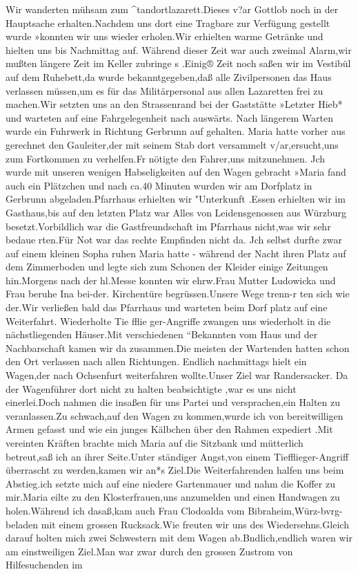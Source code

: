\documentclass[a4paper,11pt]{article}
\begin{document}
Wir wanderten mühsam zum ^tandortlazarett.Dieses v?ar Gottlob noch in der Hauptsache erhalten.Nachdem uns dort eine Tragbare zur Verfügung gestellt wurde »konnten wir uns wieder erholen.Wir erhielten warme Getränke und hielten uns bis Nachmittag auf. Während dieser Zeit war auch zweimal Alarm,wir mußten längere Zeit im Keller zubringe s .Einig® Zeit noch saßen wir im Vestibül auf dem Ruhebett,da wurde bekanntgegeben,daß alle Zivilpersonen das Haus verlassen müssen,um es für das Militärpersonal aus allen Lazaretten frei zu machen.Wir setzten uns an den Strassenrand bei der Gaststätte »Letzter Hieb* und warteten auf eine Fahrgelegenheit nach auswärts. Nach längerem Warten wurde ein Fuhrwerk in Richtung Gerbrunn auf gehalten. Maria hatte vorher aus gerechnet den Gauleiter,der mit seinem Stab dort versammelt v/ar,ersucht,uns zum Fortkommen zu verhelfen.Fr nötigte den Fahrer,uns mitzunehmen. Jch wurde mit unseren wenigen Habseligkeiten auf den Wagen gebracht »Maria fand auch ein Plätzchen und nach ca.40 Minuten wurden wir am Dorfplatz in Gerbrunn abgeladen.Pfarrhaus erhielten wir "Unterkunft .Essen erhielten wir im Gasthaus,bis auf den letzten Platz war Alles von Leidensgenossen aus Würzburg besetzt.Vorbildlich war die Gastfreundschaft im Pfarrhaus nicht,was wir sehr bedaue rten.Für Not war das rechte Empfinden nicht da. Jch selbst durfte zwar auf einem kleinen Sopha ruhen Maria hatte - während der Nacht ihren Platz auf dem Zimmerboden und legte sich zum Schonen der Kleider einige Zeitungen hin.Morgens nach der hl.Messe konnten wir ehrw.Frau Mutter Ludowicka und Frau beruhe Ina bei-der. Kirchentüre begrüssen.Unsere Wege trenn-r ten sich wie der.Wir verließen bald das Pfarrhaus und warteten beim Dorf platz auf eine Weiterfahrt. Wiederholte Tie fflie ger-Angriffe zwangen uns wiederholt in die nächstliegenden Häuser.Mit verschiedenen “Bekannten vom Haus und der Nachbarschaft kamen wir da zusammen.Die meisten der Wartenden hatten schon den Ort verlassen nach allen Richtungen. Endlich nachmittags hielt ein Wagen,der nach Ochsenfurt weiterfahren wollte.Unser Ziel war Randersacker. Da der Wagenführer dort nicht zu halten beabsichtigte ,war es uns nicht einerlei.Doch nahmen die insaßen für uns Partei und versprachen,ein Halten zu veranlassen.Zu schwach,auf den Wagen zu kommen,wurde ich von bereitwilligen Armen gefasst und wie ein junges Kälbchen über den Rahmen expediert .Mit vereinten Kräften brachte mich Maria auf die Sitzbank und mütterlich betreut,saß ich an ihrer Seite.Unter ständiger Angst,von einem Tiefflieger-Angriff überrascht zu werden,kamen wir an*s Ziel.Die Weiterfahrenden halfen uns beim Abstieg.ich setzte mich auf eine niedere Gartenmauer und nahm die Koffer zu mir.Maria eilte zu den Klosterfrauen,uns anzumelden und einen Handwagen zu holen.Während ich dasaß,kam auch Frau Clodoalda vom Bibraheim,Würz-bvrg-beladen mit einem grossen Rucksack.Wie freuten wir uns des Wiedersehns.Gleich darauf holten mich zwei Schwestern mit dem Wagen ab.Bndlich,endlich waren wir am einstweiligen Ziel.Man war zwar durch den grossen Zustrom von Hilfesuchenden im
\end{document}
